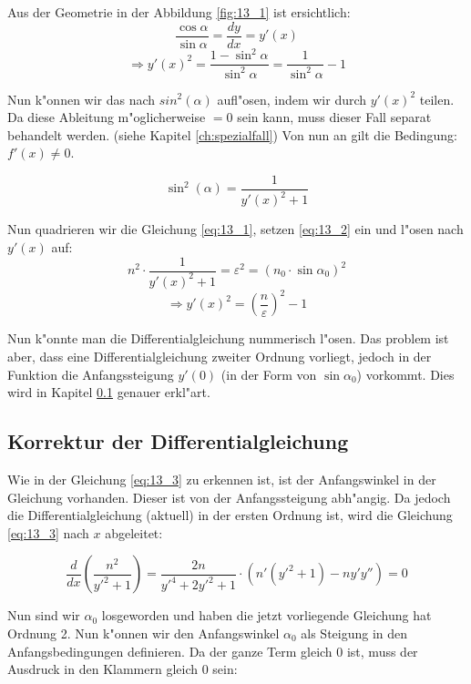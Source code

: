 Aus der Geometrie in der Abbildung \ref{fig:13_1} ist ersichtlich:
$$\frac{\cos \alpha}{\sin \alpha} = \frac{dy}{dx} = y'(x)$$
$$\Rightarrow y'(x)^2 = \frac{1 - \sin^2 \alpha}{\sin^2 \alpha} = \frac{1}{\sin^2
\alpha} - 1$$

Nun k"onnen wir das nach $sin^2(\alpha)$ aufl"osen, indem wir durch $y'(x)^2$ teilen. Da
diese Ableitung m"oglicherweise $=0$ sein kann, muss dieser Fall separat behandelt werden.
(siehe Kapitel \ref{ch:spezialfall}) Von nun an gilt die Bedingung: $f'(x) \neq 0$.

\begin{equation} \label{eq:13_2}
\sin^2 (\alpha) = \frac{1}{y'(x)^2 + 1}
\end{equation}

Nun quadrieren wir die Gleichung \ref{eq:13_1}, setzen \ref{eq:13_2} ein und l"osen
nach $y'(x)$ auf:
\begin{equation} \label{eq:13_3}
n^2 \cdot \frac{1}{y'(x)^2 + 1} = \varepsilon^2 = (n_0 \cdot \sin \alpha_0)^2
\end{equation}
\begin{equation} \label{eq:13_4}
\Rightarrow y'(x)^2 = \left( \frac{n}{\varepsilon} \right)^2 - 1
\end{equation}

Nun k"onnte man die Differentialgleichung nummerisch l"osen. Das problem ist aber, dass 
eine Differentialgleichung zweiter Ordnung vorliegt, jedoch in der Funktion die
Anfangssteigung $y'(0)$ (in der Form von $\sin \alpha_0$) vorkommt. Dies wird in Kapitel
\ref{ch:korrektur} genauer erkl"art.

\subsection{Korrektur der Differentialgleichung} \label{ch:korrektur}

Wie in der Gleichung \ref{eq:13_3} zu erkennen ist, ist der Anfangswinkel in der
Gleichung vorhanden. Dieser ist von der Anfangssteigung abh"angig. Da jedoch die
Differentialgleichung (aktuell) in der ersten Ordnung ist, wird die Gleichung
\ref{eq:13_3} nach $x$ abgeleitet:

$$\frac{d}{dx} \left( \frac{n^2}{y'^2 + 1} \right) = \frac{2n}{y'^4 +
2y'^2 + 1} \cdot \left( n'(y'^2 + 1) - n y' y'' \right) = 0$$

Nun sind wir $\alpha_0$ losgeworden und haben die jetzt vorliegende Gleichung hat Ordnung
2. Nun k"onnen wir den Anfangswinkel $\alpha_0$ als Steigung in den Anfangsbedingungen
definieren. Da der ganze Term gleich 0 ist, muss der Ausdruck in den Klammern gleich 0
sein:

